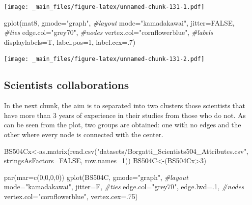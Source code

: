 \documentclass[
  notitlepage,
  onecolumn,
  openany]{book}
\newenvironment{Shaded}{\begin{snugshade}}{\end{snugshade}}
\newcommand{\AttributeTok}[1]{\textcolor[rgb]{0.77,0.63,0.00}{#1}}
\newcommand{\CommentTok}[1]{\textcolor[rgb]{0.56,0.35,0.01}{\textit{#1}}}
\newcommand{\ConstantTok}[1]{\textcolor[rgb]{0.00,0.00,0.00}{#1}}
\newcommand{\DecValTok}[1]{\textcolor[rgb]{0.00,0.00,0.81}{#1}}
\newcommand{\FunctionTok}[1]{\textcolor[rgb]{0.00,0.00,0.00}{#1}}
\newcommand{\NormalTok}[1]{#1}
\newcommand{\OtherTok}[1]{\textcolor[rgb]{0.56,0.35,0.01}{#1}}
\newcommand{\SpecialCharTok}[1]{\textcolor[rgb]{0.00,0.00,0.00}{#1}}
\newcommand{\StringTok}[1]{\textcolor[rgb]{0.31,0.60,0.02}{#1}}
\begin{document}
\texttt{[image: \_main\_files/figure-latex/unnamed-chunk-131-1.pdf]}

\begin{Shaded}
\begin{Highlighting}[]
\FunctionTok{gplot}\NormalTok{(mat8, }
      \AttributeTok{gmode=}\StringTok{"graph"}\NormalTok{,}
      \CommentTok{\#layout}
      \AttributeTok{mode=}\StringTok{"kamadakawai"}\NormalTok{,}
      \AttributeTok{jitter=}\ConstantTok{FALSE}\NormalTok{,}
      \CommentTok{\#ties}
      \AttributeTok{edge.col=}\StringTok{"grey70"}\NormalTok{,}
      \CommentTok{\#nodes}
      \AttributeTok{vertex.col=}\StringTok{"cornflowerblue"}\NormalTok{,}
      \CommentTok{\#labels}
      \AttributeTok{displaylabels=}\NormalTok{T,}
      \AttributeTok{label.pos=}\DecValTok{1}\NormalTok{,}
      \AttributeTok{label.cex=}\NormalTok{.}\DecValTok{7}\NormalTok{)}
\end{Highlighting}
\end{Shaded}

\texttt{[image: \_main\_files/figure-latex/unnamed-chunk-131-2.pdf]}

\hypertarget{scientists-collaborations}{%
\subsection{Scientists collaborations}\label{scientists-collaborations}}

In the next chunk, the aim is to separated into two clusters those scientists that have more than 3 years of experience in their studies from those who do not. As can be seen from the plot, two groups are obtained: one with no edges and the other where every node is connected with the center.

\begin{Shaded}
\begin{Highlighting}[]
\NormalTok{BS504Cx}\OtherTok{\textless{}{-}}\FunctionTok{as.matrix}\NormalTok{(}\FunctionTok{read.csv}\NormalTok{(}\StringTok{"datasets/Borgatti\_Scientists504\_Attributes.csv"}\NormalTok{,}
                            \AttributeTok{stringsAsFactors=}\ConstantTok{FALSE}\NormalTok{, }\AttributeTok{row.names=}\DecValTok{1}\NormalTok{))}
\NormalTok{BS504C}\OtherTok{\textless{}{-}}\NormalTok{(BS504Cx}\SpecialCharTok{\textgreater{}}\DecValTok{3}\NormalTok{)}

\FunctionTok{par}\NormalTok{(}\AttributeTok{mar=}\FunctionTok{c}\NormalTok{(}\DecValTok{0}\NormalTok{,}\DecValTok{0}\NormalTok{,}\DecValTok{0}\NormalTok{,}\DecValTok{0}\NormalTok{))}
\FunctionTok{gplot}\NormalTok{(BS504C, }
      \AttributeTok{gmode=}\StringTok{"graph"}\NormalTok{,}
      \CommentTok{\#layout}
      \AttributeTok{mode=}\StringTok{"kamadakawai"}\NormalTok{,}
      \AttributeTok{jitter=}\NormalTok{F,}
      \CommentTok{\#ties}
      \AttributeTok{edge.col=}\StringTok{"grey70"}\NormalTok{, }
      \AttributeTok{edge.lwd=}\NormalTok{.}\DecValTok{1}\NormalTok{,}
      \CommentTok{\#nodes}
      \AttributeTok{vertex.col=}\StringTok{"cornflowerblue"}\NormalTok{,}
      \AttributeTok{vertex.cex=}\NormalTok{.}\DecValTok{75}\NormalTok{)}
\end{Highlighting}
\end{Shaded}
\end{document}
